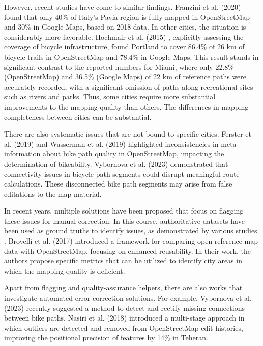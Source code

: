 However, recent studies have come to similar findings. Franzini et al. (2020) \cite{franzini_assessment_2020} found that only 40\% of Italy's Pavia region is fully mapped in OpenStreetMap and 30\% in Google Maps, based on 2018 data. In other cities, the situation is considerably more favorable. Hochmair et al. (2015) \cite{hochmair_assessing_2015}, explicitly assessing the coverage of bicycle infrastructure, found Portland to cover 86.4\% of 26 km of bicycle trails in OpenStreetMap and 78.4\% in Google Maps. This result stands in significant contrast to the reported numbers for Miami, where only 22.8\% (OpenStreetMap) and 36.5\% (Google Maps) of 22 km of reference paths were accurately recorded, with a significant omission of paths along recreational sites such as rivers and parks. Thus, some cities require more substantial improvements to the mapping quality than others. The differences in mapping completeness between cities can be substantial.

There are also systematic issues that are not bound to specific cities. Ferster et al. (2019) \cite{ferster_using_2019} and Wasserman et al. (2019) \cite{wasserman_evaluating_2019} highlighted inconsistencies in meta-information about bike path quality in OpenStreetMap, impacting the determination of bikeability. Vybornova et al. (2023) \cite{vybornova_automated_2023} demonstrated that connectivity issues in bicycle path segments could disrupt meaningful route calculations. These disconnected bike path segments may arise from false editations to the map material.

In recent years, multiple solutions have been proposed that focus on flagging these issues for manual correction. In this course, authoritative datasets have been used as ground truths to identify issues, as demonstrated by various studies \cite{haklay_how_2010, jokar_arsanjani_quality_2015, ludwig_comparison_2011}. Brovelli et al. (2017) \cite{brovelli_towards_2017} introduced a framework for comparing open reference map data with OpenStreetMap, focusing on enhanced reusability. In their work, the authors propose specific metrics that can be utilized to identify city areas in which the mapping quality is deficient.

Apart from flagging and quality-assurance helpers, there are also works that investigate automated error correction solutions. For example, Vybornova et al. (2023) \cite{vybornova_automated_2023} recently suggested a method to detect and rectify missing connections between bike paths. Nasiri et al. (2018) \cite{nasiri_improving_2018} introduced a multi-stage approach in which outliers are detected and removed from OpenStreetMap edit histories, improving the positional precision of features by 14\% in Teheran.  

